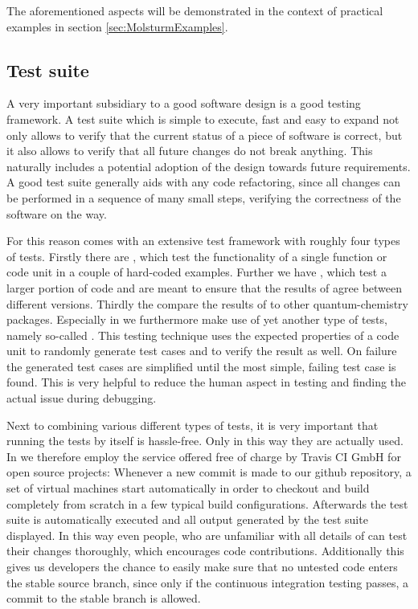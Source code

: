 The aforementioned aspects will be demonstrated
in the context of practical examples in section \vref{sec:MolsturmExamples}.

\subsection{Test suite}
\label{sec:MolsturmTestSuite}

A very important subsidiary to a good software design is a good testing framework.
A test suite which is simple to execute,
fast and easy to expand not only allows to verify
that the current status of a piece of software is correct,
but it also allows to verify that all future changes do not break anything.
This naturally includes a potential adoption of the design towards future requirements.
A good test suite generally aids with any code refactoring,
since all changes can be performed in a sequence of many small steps,
verifying the correctness of the software on the way.

For this reason \molsturm comes with an extensive test framework
with roughly four types of tests.
Firstly there are ,
which test the functionality of a single function
or code unit in a couple of hard-coded examples.
Further we have ,
which test a larger portion of code and are meant to ensure that
the results of \molsturm agree between different versions.
Thirdly the  compare
the results of \molsturm to other quantum-chemistry packages.
Especially in \lazyten we furthermore make use of yet another type of tests,
namely so-called .
This testing technique uses the expected properties of a code unit
to randomly generate test cases and to verify the result as well.
On failure the generated test cases are simplified until the most simple,
failing test case is found.
This is very helpful
to reduce the human aspect in testing
and finding the actual issue during debugging.

Next to combining various different types of tests,
it is very important that running the tests by itself is hassle-free.
Only in this way they are actually used.
In \molsturm we therefore employ the 
service offered free of charge by Travis CI GmbH for open source projects:
Whenever a new commit is made to our github repository,
a set of virtual machines start automatically
in order to checkout and build \molsturm completely from scratch
in a few typical build configurations.
Afterwards the test suite is automatically executed and
all output generated by the test suite displayed.
In this way even people, who are unfamiliar with all details of \molsturm
can test their changes thoroughly,
which encourages code contributions.
Additionally this gives us \molsturm developers
the chance to easily make sure that no untested code enters the stable source branch,
since only if the continuous integration testing passes,
a commit to the stable branch is allowed.

